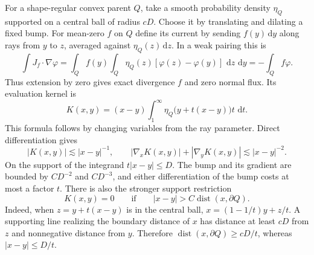 \documentclass[11pt]{article}
\newcommand{\dist}{\operatorname{dist}}
\newcommand{\dd}{\,\mathrm d}
\begin{document}
For a shape-regular convex parent \(Q\), take a smooth probability
density \(\eta_Q\) supported on a central ball of radius \(cD\).
Choose it by translating and dilating a fixed bump. For mean-zero
\(f\) on \(Q\) define its current by sending \(f(y)\dd y\) along
rays from \(y\) to \(z\), averaged against \(\eta_Q(z)\dd z\).
In a weak pairing this is
\[
 \int J_f\cdot\nabla\varphi
 =\int_Q f(y)\int_Q \eta_Q(z)
       [\varphi(z)-\varphi(y)]\,\dd z\,\dd y
 =-\int_Q f\varphi .
\]
Thus extension by zero gives exact divergence \(f\) and zero normal
flux. Its evaluation kernel is
\begin{equation}\label{eq:kernel}
 K(x,y)=(x-y)\int_1^\infty \eta_Q\bigl(y+t(x-y)\bigr)t\,\dd t .
\end{equation}
This formula follows by changing variables from the ray parameter.
Direct differentiation gives
\[
 |K(x,y)|\lesssim |x-y|^{-1},\qquad
 |\nabla_x K(x,y)|+|\nabla_y K(x,y)|\lesssim |x-y|^{-2}.
\]
On the support of the integrand \(t|x-y|\le D\).
The bump and its gradient are bounded by \(CD^{-2}\)
and \(CD^{-3}\), and either differentiation of the bump
costs at most a factor \(t\).
There is also the stronger support restriction
\begin{equation}\label{eq:support}
 K(x,y)=0\qquad\text{if}\qquad
 |x-y|>C\dist(x,\partial Q).
\end{equation}
Indeed, when \(z=y+t(x-y)\) is in the central ball,
\(x=(1-1/t)y+z/t\). A supporting line realizing the boundary
distance of \(x\) has distance at least \(cD\) from \(z\)
and nonnegative distance from \(y\). Therefore
\(\dist(x,\partial Q)\ge cD/t\), whereas \(|x-y|\le D/t\).
\end{document}
